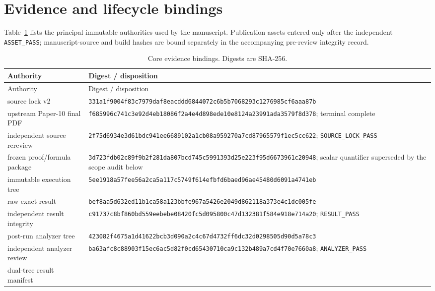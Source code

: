 \documentclass[11pt]{article}
\theoremstyle{definition}
\theoremstyle{remark}
\begin{document}
\section{Evidence and lifecycle bindings}
\label{app:provenance}

Table~\ref{tab:provenance} lists the principal immutable authorities used by
the manuscript.  Publication assets entered only after the independent
\texttt{ASSET\_PASS}; manuscript-source and build hashes are bound separately
in the accompanying pre-review integrity record.

\begin{longtable}{@{}p{}p{}@{}}
  \caption{Core evidence bindings.  Digests are SHA-256.}
  \label{tab:provenance}\\
  \toprule
  Authority & Digest / disposition \\
  \midrule
  \endfirsthead
  \toprule
  Authority & Digest / disposition \\
  \midrule
  \endhead
  source lock v2
    & \nolinkurl{331a1f9004f83c7979daf8eacddd6844072c6b5b7068293c1276985cf6aaa87b} \\
  upstream Paper-10 final PDF
    & \nolinkurl{f685996c741c3e92d4eb18086f2a4e4d898ede10e8124a23991ada3579f8d378};
      terminal complete \\
  independent source rereview
    & \nolinkurl{2f75d6934e3d61bdc941ee6689102a1cb08a959270a7cd87965579f1ec5cc622};
      \texttt{SOURCE\_LOCK\_PASS} \\
  frozen proof/formula package
    & \nolinkurl{3d723fdb02c89f9b2f281da807bcd745c5991393d25e223f95d6673961c20948};
      scalar quantifier superseded by the scope audit below \\
  immutable execution tree
    & \nolinkurl{5ee1918a57fee56a2ca5a117c5749f614efbfd6baed96ae45480d6091a4741eb} \\
  raw exact result
    & \nolinkurl{bef8aa5d632ed11b1ca58a123bbfe967a5426e2049d862118a373e4c1dc005fe} \\
  independent result integrity
    & \nolinkurl{c91737c8bf860bd559eebebe08420fc5d095800c47d132381f584e918e714a20};
      \texttt{RESULT\_PASS} \\
  post-run analyzer tree
    & \nolinkurl{423082f4675a1d41622bcb3d090a2c4c67d4732ff6dc32d0298505d90d5a78c3} \\
  independent analyzer review
    & \nolinkurl{ba63afc8c88903f15ec6ac5d82f0cd65430710ca9c132b489a7cd4f70e7660a8};
      \texttt{ANALYZER\_PASS} \\
  dual-tree result manifest

\end{longtable}
\end{document}
